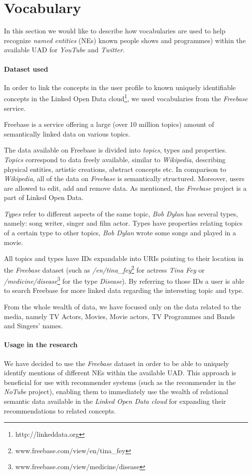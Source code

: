 \section{Vocabulary}
\label{sec:vocabulary}
In this section we would like to describe how vocabularies are used to help recognize \textit{named entities} (NEs)
known people shows and programmes) within the available UAD for \textit{YouTube} and \textit{Twitter}.

\paragraph{Dataset used}
In order to link the concepts in the user profile to known uniquely identifiable concepts in the Linked Open Data
cloud\footnote{http://linkeddata.org}, we used vocabularies from the \textit{Freebase} service.

Freebase is a service offering a large (over 10 million topics) amount of semantically linked data on various topics.

The data available on Freebase is divided into \textit{topics}, types and properties. \textit{Topics} correspond to data
freely available, similar to \textit{Wikipedia}, describing physical entities, artistic creations, abstract concepts
etc. In comparison to \textit{Wikipedia}, all of the data on \textit{Freebase} is semantically structured. Moreover,
users are allowed to edit, add and remove data. As mentioned, the \textit{Freebase} project is a part of Linked Open Data.

\textit{Types} refer to different aspects of the same topic, \eg \textit{Bob Dylan} has several types, namely:
song writer, singer and film actor. Types have properties relating topics of a certain type to other topics, \eg
\textit{Bob Dylan} wrote some songs and played in a movie.

All topics and types have IDs expandable into URIs pointing to their location in the \textit{Freebase} dataset
(such as \textit{/en/tina\_fey}\footnote{www.freebase.com/view/en/tina\_fey} for actress \textit{Tina Fey}
or \textit{/medicine/disease}\footnote{www.freebase.com/view/medicine/disease} for the type \textit{Disease}).
By referring to those IDs a user is able to search Freebase for more linked data regarding the interesting topic and type.

From the whole wealth of data, we have focused only on the data related to the media, namely TV Actors, Movies, Movie
actors, TV Programmes and Bands and Singers' names.

\paragraph{Usage in the research}
We have decided to use the \textit{Freebase} dataset in order to be able to uniquely identify mentions of different NEs
within the available UAD. This approach is beneficial for use with recommender systems (such as the recommender
in the \textit{NoTube} project), enabling them to immediately use the wealth of relational semantic data available
in the \textit{Linked Open Data cloud} for expanding their recommendations to related concepts.

